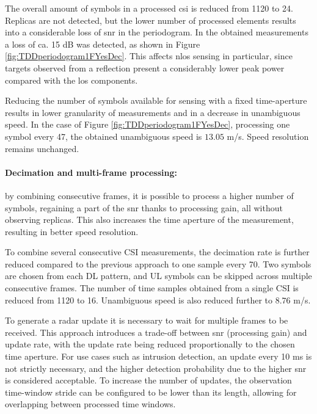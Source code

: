 		     The overall amount of symbols in a processed \gls{csi} is reduced from 1120 to 24.
		     Replicas are not detected, but the lower number of processed elements results into a considerable loss of \gls{snr} in the periodogram. In the obtained measurements a loss of ca. 15 dB was detected, as shown in Figure \ref{fig:TDDperiodogram1FYesDec}. 
		     This affects \gls{nlos} sensing in particular, since targets observed from a reflection present a considerably lower peak power compared with the \gls{los} components.
		
		     Reducing the number of symbols available for sensing with a fixed time-aperture results in lower granularity of measurements and in a decrease in unambiguous speed. In the case of Figure \ref{fig:TDDperiodogram1FYesDec}, processing one symbol every 47, the obtained unambiguous speed is $13.05$ m/s. Speed resolution remains unchanged.
		    
		     \paragraph{Decimation and multi-frame processing:}
		     by combining consecutive frames, it is possible to process a higher number of symbols, regaining a part of the \gls{snr} thanks to processing gain, all without observing replicas. 
		     This also increases the time aperture of the measurement, resulting in better speed resolution.
		     
			 To combine several consecutive CSI measurements, the decimation rate is further reduced compared to the previous approach to one sample every 70. 
			 Two symbols are chosen from each DL pattern, and UL symbols can be skipped across multiple consecutive frames.
			 The number of time samples obtained from a single CSI is reduced from 1120 to 16.
			 Unambiguous speed is also reduced further to $8.76$ m/s.
			 
			 To generate a radar update it is necessary to wait for multiple frames to be received.
			 This approach introduces a trade-off between \gls{snr} (processing gain) and update rate, with the update rate being reduced proportionally to the chosen time aperture.
		     For use cases such as intrusion detection, an update every 10 ms is not strictly necessary, and the higher detection probability due to the higher \gls{snr} is considered acceptable.
		     To increase the number of updates, the observation time-window stride can be configured to be lower than its length, allowing for overlapping between processed time windows.
		      
